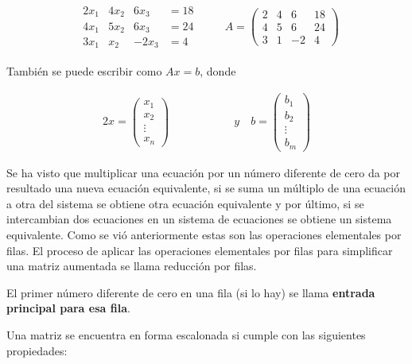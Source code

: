 \documentclass{article}
\begin{document}
\begin{equation*}
    \begin{matrix}
        \begin{array}{rrrr}
            2x_1 & 4x_2 & 6x_3 &=18\\
            4x_1 & 5x_2 & 6x_3 &=24\\
            3x_1 & x_2  & -2x_3 &=4            
        \end{array}
    \end{matrix}
    \quad \quad A = \left(\begin{array}{rrr|r}
        2 & 4 & 6 & 18\\
        4 & 5 & 6 & 24\\
        3 & 1 & -2& 4
    \end{array}\right)
\end{equation*}

También se puede escribir como $Ax = b$, donde 

\begin{alignat*}{2}
    x= \begin{pmatrix}
        x_1\\
        x_2\\
        \vdots\\
        x_n
    \end{pmatrix} 
& \hspace{ 4em}%
\quad y \quad b = 
    \begin{pmatrix}
        b_1\\
        b_2\\
        \vdots\\
        b_m
    \end{pmatrix} 
\end{alignat*}

Se ha visto que multiplicar una ecuación por un número diferente de cero da por resultado una nueva ecuación equivalente, si se suma un múltiplo de una ecuación a otra del sistema se obtiene otra ecuación equivalente y por último, si se intercambian dos ecuaciones en un sistema de ecuaciones se obtiene un sistema equivalente. Como se vió anteriormente estas son las operaciones elementales por filas. El proceso de aplicar las operaciones elementales por filas para simplificar una matriz aumentada se llama reducción por filas. 

El primer número diferente de cero en una fila (si lo hay) se llama \textbf{entrada principal para esa fila}. 

Una matriz se encuentra en forma escalonada si cumple con las siguientes propiedades:
\end{document}
